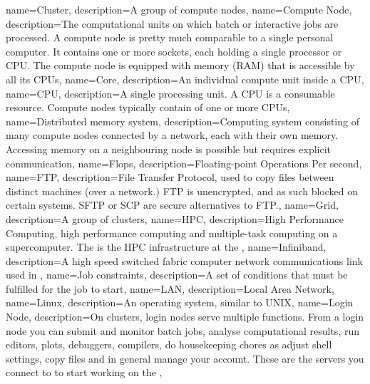 {
  name={Cluster},
  description={A group of compute nodes},
}
{
  name={Compute Node},
  description={The computational units on which batch or interactive jobs are processed. A compute node is pretty much comparable to a single personal computer. It contains one or more sockets, each holding a single processor or CPU. The compute node is equipped with memory (RAM) that is accessible by all its CPUs},
}
{
  name={Core},
  description={An individual compute unit inside a CPU},
}
{
  name={CPU},
  description={A single processing unit. A CPU is a consumable resource. Compute nodes typically contain of one or more CPUs},
}
{
  name={Distributed memory system},
  description={Computing system consisting of many compute nodes connected by a network, each with their own memory. Accessing memory on a neighbouring node is possible but requires explicit communication},
}
{
  name={Flops},
  description={Floating-point Operations Per second},
}
{
  name={FTP},
  description={File Transfer Protocol, used to copy files between distinct machines (over a network.) FTP is unencrypted, and as such blocked on certain systems. SFTP or SCP are secure alternatives to FTP.},
}
{
  name={Grid},
  description={A group of clusters},
}
{
  name={HPC},
  description={High Performance Computing, high performance computing and multiple-task computing on a supercomputer. The \hpcInfra is the HPC infrastructure at the \university},
}
{
  name={Infiniband},
  description={A high speed switched fabric computer network communications link used in \hpc},
}
{
  name={Job constraints},
  description={A set of conditions that must be fulfilled for the job to start},
}
{
  name={LAN},
  description={Local Area Network},
}
{
  name={Linux},
  description={An operating system, similar to UNIX},
}
{
  name={Login Node},
  description={On \hpc clusters, login nodes serve multiple functions. From a login node you can submit and monitor batch jobs, analyse computational results, run editors, plots, debuggers, compilers, do housekeeping chores as adjust shell settings, copy files and in general manage your account. These are the servers you connect to to start working on the \hpcInfra},
}
